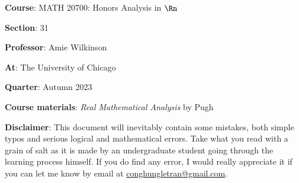 \textbf{Course}: MATH 20700: Honors Analysis in $\Rn$

\textbf{Section}: 31

\textbf{Professor}: Amie Wilkinson

\textbf{At}: The University of Chicago

\textbf{Quarter}: Autumn 2023

\textbf{Course materials}: \textit{Real Mathematical Analysis} by Pugh

\vspace{1cm}
\textbf{Disclaimer}: This document will inevitably contain some mistakes, both simple typos and serious logical and mathematical errors. Take what you read with a grain of salt as it is made by an undergraduate student going through the learning process himself. If you do find any error, I would really appreciate it if you can let me know by email at \href{mailto:conghungletran@gmail.com}{conghungletran@gmail.com}.